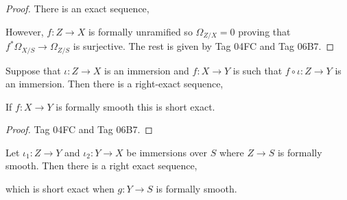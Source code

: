 \documentclass[12pt]{article}
\begin{document}
\begin{proof}
There is an exact sequence,
\begin{center}
\end{center}
However, $f : Z \to X$ is formally unramified so $\Omega_{Z/X} = 0$ proving that $f^* \Omega_{X/S} \to \Omega_{Z/S}$ is surjective. The rest is given by Tag 04FC and Tag 06B7. 
\end{proof}

\begin{prop}
Suppose that $\iota : Z \to X$ is an immersion and $f : X \to Y$ is such that $f \circ \iota : Z \to Y$ is an immersion. Then there is a right-exact sequence,
\begin{center}
\end{center}
If $f : X \to Y$ is formally smooth this is short exact.
\end{prop}

\begin{proof}
Tag 04FC and Tag 06B7.
\end{proof}

\begin{prop}
Let $\iota_1 : Z \to Y$ and $\iota_2 : Y \to X$ be immersions over $S$ where $Z \to S$ is formally smooth. Then there is a right exact sequence,
\begin{center}
\end{center}
which is short exact when $g : Y \to S$ is formally smooth.
\end{prop}
\end{document}
